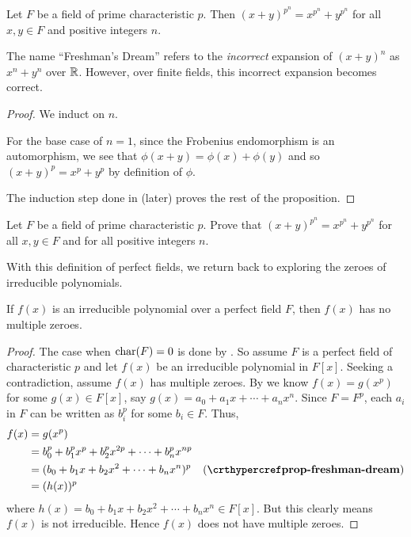 \begin{proposition}\label{prop-freshman-dream}
    Let $F$ be a field of prime characteristic $p$. Then $(x + y)^{p^n} = x^{p^n} + y^{p^n}$ for all $x,y \in F$ and positive integers $n$.
\end{proposition}
\begin{remark}
    The name ``Freshman's Dream'' refers to the \textit{incorrect} expansion of $(x+y)^n$ as $x^n + y^n$ over $\mathbb{R}$. However, over finite fields, this incorrect expansion becomes correct.
\end{remark}
\begin{proof}
    We induct on $n$.

    For the base case of $n = 1$, since the Frobenius endomorphism is an automorphism, we see that $\phi(x+y) = \phi(x) + \phi(y)$ and so $(x+y)^p = x^p + y^p$ by definition of $\phi$.

    The induction step done in  (later) proves the rest of the proposition.
\end{proof}

\begin{exercise}\label{exercise-freshman-dream}
    Let $F$ be a field of prime characteristic $p$. Prove that $(x + y)^{p^n} = x^{p^n} + y^{p^n}$ for all $x,y \in F$ and for all positive integers $n$.
\end{exercise}

With this definition of perfect fields, we return back to exploring the zeroes of irreducible polynomials.

\begin{theorem}\label{thrm-irreducible-polynomial-over-perfect-field-has-no-multiple-zeroes}
    If $f(x)$ is an irreducible polynomial over a perfect field $F$, then $f(x)$ has no multiple zeroes.
\end{theorem}
\begin{proof}
    The case when $\mathrm{char}(F) = 0$ is done by . So assume $F$ is a perfect field of characteristic $p$ and let $f(x)$ be an irreducible polynomial in $F[x]$. Seeking a contradiction, assume $f(x)$ has multiple zeroes. By  we know $f(x) = g(x^p)$ for some $g(x) \in F[x]$, say $g(x) = a_0 + a_1x + \cdots + a_nx^n$. Since $F = F^p$, each $a_i$ in $F$ can be written as $b_i^p$ for some $b_i \in F$. Thus,
    \begin{align*}
        f(x) &= g(x^p)\\
        &= b_0^p + b_1^px^p + b_2^px^{2p} + \cdots + b_n^px^{np}\\
        &= (b_0 + b_1x + b_2x^2 + \cdots + b_nx^n)^p & (\myref{prop-freshman-dream})\\
        &= (h(x))^p
    \end{align*}
    where $h(x) = b_0 + b_1x + b_2x^2 + \cdots + b_nx^n \in F[x]$. But this clearly means $f(x)$ is not irreducible. Hence $f(x)$ does not have multiple zeroes.
\end{proof}

